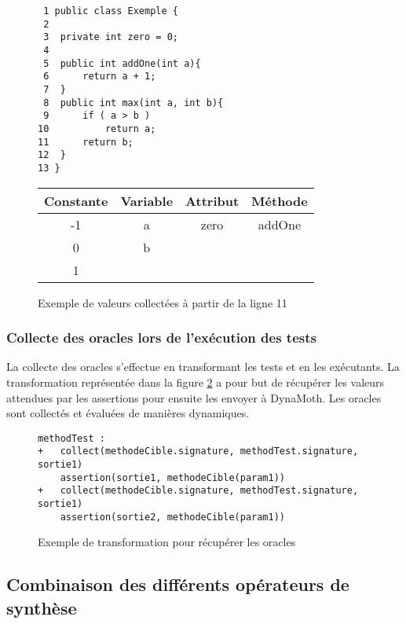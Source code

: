 \begin{figure}[H]
\begin{lstlisting}
 1 public class Exemple {
 2 
 3	private int zero = 0;
 4
 5	public int addOne(int a){
 6		return a + 1;
 7	}
 8	public int max(int a, int b){
 9		if ( a > b )
10			return a;
11		return b;	
12	}
13 }
\end{lstlisting}
\begin{center}

\begin{tabular}{|c|c|c|c|}
\hline
Constante & Variable & Attribut & Méthode  \\
\hline
-1 & a & zero & addOne\\
\hline
0  & b & &\\
\hline
1  &  & & \\
 \hline
\end{tabular}

\end{center}
\label{fig:exemple_collecte}
\caption{Exemple de valeurs collectées à partir de la ligne 11}
\end{figure}

\subsubsection{Collecte des oracles lors de l'exécution des tests}
\label{subsec:collecte_sorties}
\par La collecte des oracles s'effectue en transformant les tests et en les exécutants. La transformation représentée dans la figure \ref{fig:collect_sorties} a pour but de récupérer les valeurs attendues par les assertions pour ensuite les envoyer à DynaMoth. Les oracles sont collectés et évaluées de manières dynamiques.

\begin{figure}[H]
\begin{lstlisting}
methodTest :
+   collect(methodeCible.signature, methodTest.signature, sortie1)
    assertion(sortie1, methodeCible(param1))
+   collect(methodeCible.signature, methodTest.signature, sortie1)
    assertion(sortie2, methodeCible(param1))
\end{lstlisting}
\caption{Exemple de transformation pour récupérer les oracles}
\label{fig:collect_sorties}
\end{figure}

\subsection{Combinaison des différents opérateurs de synthèse}
\label{subsec:combinaisons}

